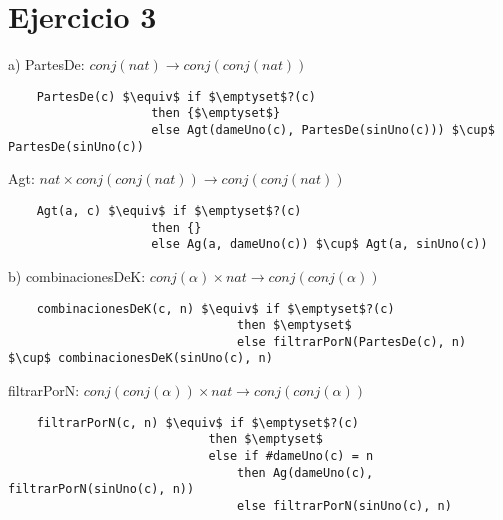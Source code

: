 \section{Ejercicio 3}

a) PartesDe: $conj(nat) \rightarrow conj(conj(nat))$

\begin{lstlisting}
    PartesDe(c) $\equiv$ if $\emptyset$?(c) 
                    then {$\emptyset$}
                    else Agt(dameUno(c), PartesDe(sinUno(c))) $\cup$ PartesDe(sinUno(c))
\end{lstlisting}

Agt: $nat \times conj(conj(nat)) \rightarrow conj(conj(nat))$
\begin{lstlisting}
    Agt(a, c) $\equiv$ if $\emptyset$?(c)
                    then {}
                    else Ag(a, dameUno(c)) $\cup$ Agt(a, sinUno(c))
\end{lstlisting}

b) combinacionesDeK: $conj(\alpha) \times nat \rightarrow conj(conj(\alpha))$
\begin{lstlisting}
    combinacionesDeK(c, n) $\equiv$ if $\emptyset$?(c)
                                then $\emptyset$
                                else filtrarPorN(PartesDe(c), n) $\cup$ combinacionesDeK(sinUno(c), n)
\end{lstlisting}

filtrarPorN: $conj(conj(\alpha)) \times nat \rightarrow conj(conj(\alpha))$
\begin{lstlisting}
    filtrarPorN(c, n) $\equiv$ if $\emptyset$?(c)
                            then $\emptyset$
                            else if #dameUno(c) = n
                                then Ag(dameUno(c), filtrarPorN(sinUno(c), n))
                                else filtrarPorN(sinUno(c), n)
\end{lstlisting}

